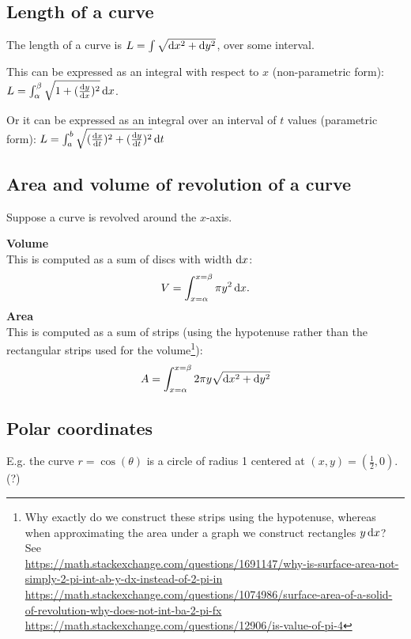 \subsection{Length of a curve}

The length of a curve is $L = \int \sqrt{\dx^2 + \dy^2}$, over some interval.

This can be expressed as an integral with respect to $x$ (non-parametric form):
$L = \int_\alpha^\beta \sqrt{1 + (\frac{\dy}{\dx})^2} \dx$.

Or it can be expressed as an integral over an interval of $t$ values (parametric form):
$L = \int_a^b \sqrt{ (\frac{\dx}{\dt})^2 + (\frac{\dy}{\dt})^2} \dt$

\subsection{Area and volume of revolution of a curve}
Suppose a curve is revolved around the $x$-axis.

\textbf{Volume}\\
This is computed as a sum of discs with width $\dx$:
\begin{align*}
  V = \int_{x=\alpha}^{x=\beta} \pi y^2 \dx.
\end{align*}
\textbf{Area}\\
This is computed as a sum of strips (using the hypotenuse rather than the rectangular strips used for the volume\footnote{Why exactly do we
  construct these strips using the hypotenuse, whereas when approximating the
  area under a graph we construct rectangles $y\dx$? See \\
  \url{https://math.stackexchange.com/questions/1691147/why-is-surface-area-not-simply-2-pi-int-ab-y-dx-instead-of-2-pi-in}\\
  \url{https://math.stackexchange.com/questions/1074986/surface-area-of-a-solid-of-revolution-why-does-not-int-ba-2-pi-fx}\\
  \url{https://math.stackexchange.com/questions/12906/is-value-of-pi-4}}):
\begin{align*}
  A = \int_{x=\alpha}^{x=\beta}  2\pi y \sqrt{\dx^2 + \dy^2}
\end{align*}


\subsection{Polar coordinates}

E.g. the curve $r = \cos(\theta)$ is a circle of radius 1 centered at
$(x, y) = (\frac{1}{2}, 0)$. (?)

